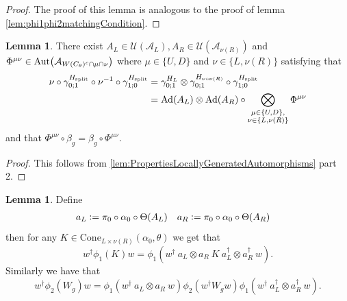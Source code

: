 \documentclass[12pt,a4paper,twoside]{article}
\newcommand{\defeq}{\vcentcolon=}
\let\originalleft\left
\let\originalright\right
\renewcommand{\left}{\mathopen{}\mathclose\bgroup\originalleft}
\renewcommand{\right}{\aftergroup\egroup\originalright}
\newcommand{\UU}{\mathcal U}
\renewcommand{\AA}{\mathcal A}
\newcommand{\Ad}[1]{\textrm{Ad}\left(#1\right)}
\newcommand{\Aut}[1]{\textrm{Aut}\left(#1\right)}
\theoremstyle{definition}
\newtheorem{lemma}[theorem]{Lemma}
\numberwithin{equation}{section}
\begin{document}
\begin{proof}
	The proof of this lemma is analogous to the proof of lemma \ref{lem:phi1phi2matchingCondition}.
\end{proof}
\begin{lemma}
	There exist $A_L\in\UU(\AA_{L}),A_R\in\UU(\AA_{\nu(R)})$ and $\Phi^{\mu\nu}\in\Aut{\AA_{W(C_\theta)^c\cap\mu\cap\nu}}$ where $\mu\in\{U,D\}$ and $\nu\in\{L,\nu(R)\}$ satisfying that
	\begin{align}
		\nu\circ\gamma^{H_{\text{split}}}_{0;1}\circ\nu^{-1}\circ\gamma^{H_{\text{split}}}_{1;0}&=\gamma^{H_L}_{0;1}\otimes\gamma^{H_{\nu\circ\nu(R)}}_{0;1}\circ\gamma^{H_{\text{split}}}_{1;0}\\
		\label{eq:TranslatingSplittedTimeEvolution}
		&=\Ad{A_L}\otimes\Ad{A_R}\circ\bigotimes_{\substack{\mu\in\{U,D\},\\\nu\in\{L,\nu(R)\}}}\Phi^{\mu\nu}
	\end{align}
	and that $\Phi^{\mu\nu}\circ\beta_g=\beta_g\circ\Phi^{\mu\nu}$.
\end{lemma}
\begin{proof}
	This follows from \ref{lem:PropertiesLocallyGeneratedAutomorphisms} part 2.
\end{proof}
\begin{lemma}
	Define
	\begin{align}
		a_L&\defeq \pi_0\circ\alpha_0\circ\Theta(A_L)&a_R&\defeq \pi_0\circ\alpha_0\circ\Theta(A_R)
	\end{align}
	then for any $K\in\text{Cone}_{L\times\nu(R)}(\alpha_0,\theta)$ we get that
	\begin{equation}\label{eq:TranslationOutOfPhi_K}
		w^\dagger \phi_1(K)w=\phi_1(w^\dagger \: a_L\otimes a_R \: K \: a_L^\dagger\otimes a_R^\dagger \: w).
	\end{equation}
	Similarly we have that
	\begin{equation}\label{eq:TranslationOutOfPhi_W}
		w^\dagger \phi_2(W_g)w=\phi_1(w^\dagger \: a_L\otimes a_R \: w)\phi_2(w^\dagger W_g w)\phi_1(w^\dagger \: a_L^\dagger\otimes a_R^\dagger \: w).
	\end{equation}
\end{lemma}
\end{document}
